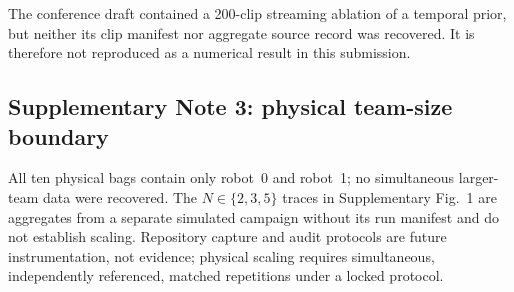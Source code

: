 \documentclass[11pt]{article}
\begin{document}
The conference draft contained a 200-clip streaming ablation of a temporal prior, but neither its clip manifest nor aggregate source record was recovered. It is therefore not reproduced as a numerical result in this submission.

\subsection*{Supplementary Note 3: physical team-size boundary}
\vspace{-0.25em}
All ten physical bags contain only robot~0 and robot~1; no simultaneous larger-team data were recovered. The $N\in\{2,3,5\}$ traces in Supplementary Fig.~1 are aggregates from a separate simulated campaign without its run manifest and do not establish scaling. Repository capture and audit protocols are future instrumentation, not evidence; physical scaling requires simultaneous, independently referenced, matched repetitions under a locked protocol.
\endgroup
\end{document}
